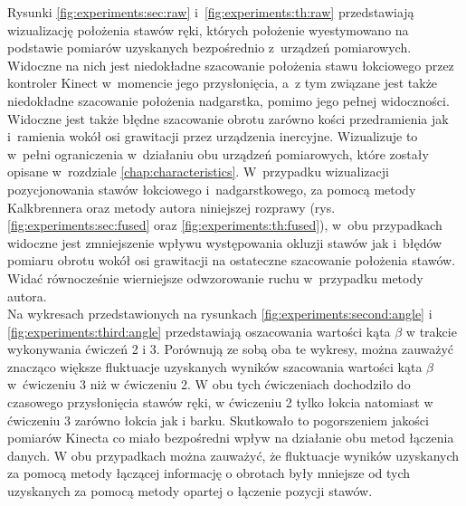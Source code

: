 Rysunki \ref{fig:experiments:sec:raw} i~\ref{fig:experiments:th:raw} przedstawiają wizualizację położenia stawów ręki, których położenie wyestymowano na podstawie pomiarów uzyskanych bezpośrednio z~urządzeń pomiarowych. Widoczne na nich jest niedokładne szacowanie położenia stawu łokciowego przez kontroler Kinect w~momencie jego przysłonięcia, a~z tym związane jest także niedokładne szacowanie położenia nadgarstka, pomimo jego pełnej widoczności. Widoczne jest także błędne szacowanie obrotu zarówno kości przedramienia jak i~ramienia wokół osi grawitacji przez urządzenia inercyjne. Wizualizuje to w~pełni ograniczenia w~działaniu obu urządzeń pomiarowych, które zostały opisane w~rozdziale \ref{chap:characteristics}. W~przypadku wizualizacji pozycjonowania stawów łokciowego i~nadgarstkowego, za pomocą metody Kalkbrennera oraz metody autora niniejszej rozprawy (rys. \ref{fig:experiments:sec:fused} oraz \ref{fig:experiments:th:fused}), w~obu przypadkach widoczne jest zmniejszenie wpływu występowania okluzji stawów jak i~błędów pomiaru obrotu wokół osi grawitacji na ostateczne szacowanie położenia stawów. Widać równocześnie wierniejsze odwzorowanie ruchu w~przypadku metody autora.\\
				
Na wykresach przedstawionych na rysunkach \ref{fig:experiments:second:angle} i \ref{fig:experiments:third:angle} przedstawiają oszacowania wartości kąta $\beta$ w trakcie wykonywania ćwiczeń 2 i 3. Porównują ze sobą oba te wykresy, można zauważyć znacząco większe fluktuacje uzyskanych wyników szacowania wartości kąta $\beta$ w~ćwiczeniu 3 niż w ćwiczeniu 2. W obu tych ćwiczeniach dochodziło do czasowego przysłonięcia stawów ręki, w ćwiczeniu 2 tylko łokcia natomiast w ćwiczeniu 3 zarówno łokcia jak i barku. Skutkowało to pogorszeniem jakości pomiarów Kinecta co miało bezpośredni wpływ na działanie obu metod łączenia danych. W obu przypadkach można zauważyć, że fluktuacje wyników uzyskanych za pomocą metody łączącej informację o obrotach były mniejsze od tych uzyskanych za pomocą metody opartej o łączenie pozycji stawów.
				
